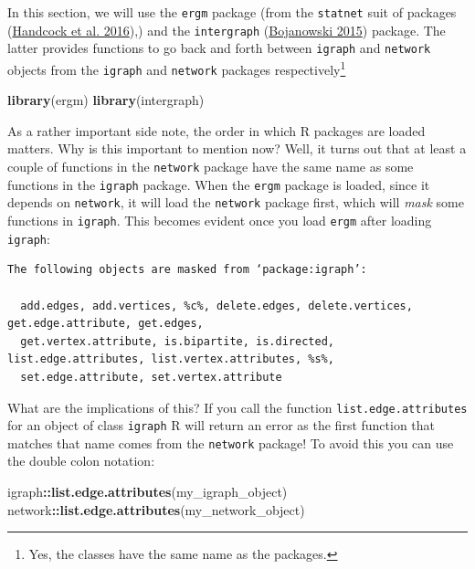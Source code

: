 \documentclass[
]{book}
\newenvironment{Shaded}{\begin{snugshade}}{\end{snugshade}}
\newcommand{\FunctionTok}[1]{\textcolor[rgb]{0.13,0.29,0.53}{\textbf{#1}}}
\newcommand{\NormalTok}[1]{#1}
\newcommand{\SpecialCharTok}[1]{\textcolor[rgb]{0.81,0.36,0.00}{\textbf{#1}}}
\begin{document}
In this section, we will use the \texttt{ergm} package (from the \texttt{statnet} suit of packages (\protect\hyperlink{ref-R-statnet}{Handcock et al. 2016}),) and the \texttt{intergraph} (\protect\hyperlink{ref-R-intergraph}{Bojanowski 2015}) package. The latter provides functions to go back and forth between \texttt{igraph} and \texttt{network} objects from the \texttt{igraph} and \texttt{network} packages respectively\footnote{Yes, the classes have the same name as the packages.}

\begin{Shaded}
\begin{Highlighting}[]
\FunctionTok{library}\NormalTok{(ergm)}
\FunctionTok{library}\NormalTok{(intergraph)}
\end{Highlighting}
\end{Shaded}

As a rather important side note, the order in which R packages are loaded matters. Why is this important to mention now? Well, it turns out that at least a couple of functions in the \texttt{network} package have the same name as some functions in the \texttt{igraph} package. When the \texttt{ergm} package is loaded, since it depends on \texttt{network}, it will load the \texttt{network} package first, which will \emph{mask} some functions in \texttt{igraph}. This becomes evident once you load \texttt{ergm} after loading \texttt{igraph}:

\begin{verbatim}
The following objects are masked from ‘package:igraph’:

  add.edges, add.vertices, %c%, delete.edges, delete.vertices, get.edge.attribute, get.edges,
  get.vertex.attribute, is.bipartite, is.directed, list.edge.attributes, list.vertex.attributes, %s%,
  set.edge.attribute, set.vertex.attribute
\end{verbatim}

What are the implications of this? If you call the function \texttt{list.edge.attributes} for an object of class \texttt{igraph} R will return an error as the first function that matches that name comes from the \texttt{network} package! To avoid this you can use the double colon notation:

\begin{Shaded}
\begin{Highlighting}[]
\NormalTok{igraph}\SpecialCharTok{::}\FunctionTok{list.edge.attributes}\NormalTok{(my\_igraph\_object)}
\NormalTok{network}\SpecialCharTok{::}\FunctionTok{list.edge.attributes}\NormalTok{(my\_network\_object)}
\end{Highlighting}
\end{Shaded}
\end{document}
